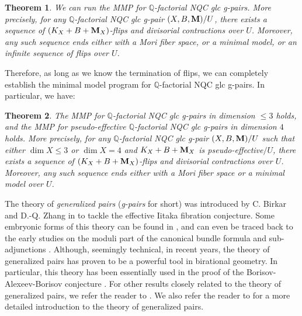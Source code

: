 \documentclass[11pt]{amsart}
\numberwithin{equation}{section}
\newcommand{\Mm}{{\bf{M}}}
\newcommand{\Qq}{\mathbb{Q}}
\newtheorem{thm}{Theorem}[section]
\theoremstyle{definition}
\theoremstyle{definition}
\theoremstyle{definition}
\begin{document}
\begin{thm}\label{thm: can run gpair mmp}
We can run the MMP for $\Qq$-factorial NQC glc g-pairs. More precisely, for any $\Qq$-factorial NQC glc g-pair $(X,B,\Mm)/U$, there exists a sequence of $(K_X+B+\Mm_X)$-flips and divisorial contractions over $U$. Moreover, any such sequence ends either with a Mori fiber space, or a minimal model, or an infinite sequence of flips over $U$.
\end{thm}

Therefore, as long as we know the termination of flips, we can completely establish the minimal model program for $\Qq$-factorial NQC glc g-pairs. In particular, we have:

\begin{thm}\label{thm: gpair mmp 3fold and pe fourfold}
The MMP for $\Qq$-factorial NQC glc g-pairs in dimension $\leq 3$ holds, and the MMP for pseudo-effective $\Qq$-factorial NQC glc g-pairs in dimension $4$ holds. More precisely, for any $\Qq$-factorial NQC glc g-pair $(X,B,\Mm)/U$ such that either $\dim X\leq 3$ or $\dim X=4$ and $K_X+B+\Mm_X$ is pseudo-effective$/U$, there exists a sequence of $(K_X+B+\Mm_X)$-flips and divisorial contractions over $U$. Moreover, any such sequence ends either with a Mori fiber space or a minimal model over $U$.

\end{thm}

\medskip


The theory of \emph{generalized pairs} (\emph{g-pairs} for short) was introduced by C. Birkar and D.-Q. Zhang in \cite{BZ16} to tackle the effective Iitaka fibration conjecture. Some embryonic forms of this theory can be found in \cite{Bir12b,BH14}, and can even be traced back to the early studies on the moduli part of the canonical bundle formula and sub-adjunctions \cite{Kaw98,FM00}. Although, seemingly technical, in recent years, the theory of generalized pairs has proven to be a powerful tool in birational geometry. In particular, this theory has been essentially used in the proof of the Borisov-Alexeev-Borisov conjecture \cite{Bir19,Bir21a}. For other results closely related to the theory of generalized pairs, we refer the reader to \cite{HX15,Fil18a,Mor18,HL18, Fil18b,Bir18,HH19,HL19,LT19,HM20,HL20a,HL20b,HL20d,LP20a,LP20b,Li20,Hu20,FS20a,Fil20,Bir20a,HL20c,CX20,Bir20c,FS20b,FW20,BDCS20,CT20,Sho20,Has20,Li21,Liu21,LX21,Hu21,Jia21,Bir21b,FH21}. We also refer the reader to \cite{Bir20b} for a more detailed introduction to the theory of generalized pairs.
\end{document}
